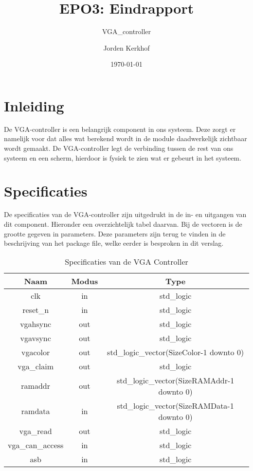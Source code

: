 \documentclass{scrartcl}  %
\author{ Jorden {Kerkhof}  }
\title{EPO3: Eindrapport}
\subtitle{VGA\_controller}
\date {\today}
\begin{document}
\maketitle
\vspace{80 mm}

\newpage
\setlength{\cftbeforetoctitleskip}{-3em}
\tableofcontents
\newpage

\section{Inleiding}
De VGA-controller is een belangrijk component in ons systeem. Deze zorgt er namelijk voor dat alles wat berekend wordt in de module daadwerkelijk zichtbaar wordt gemaakt. De VGA-controller legt de verbinding tussen de rest van ons systeem en een scherm, hierdoor is fysiek te zien wat er gebeurt in het systeem. 

\section{Specificaties}

De specificaties van de VGA-controller zijn uitgedrukt in de in- en uitgangen van dit component. Hieronder een overzichtelijk tabel daarvan. Bij de vectoren is de grootte gegeven in parameters. Deze parameters zijn terug te vinden in de beschrijving van het package file, welke eerder is besproken in dit verslag.

\begin{table}[H]
\centering
\caption{Specificaties van de VGA Controller }
\label{tab:spec-vgacontroller}
\begin{tabular}{c c c}
	\hline\hline
 	Naam & Modus & Type\\
 	\hline	
	clk & in & std\_logic \\ 
	reset\_n & in & std\_logic \\ 
	vgahsync & out & std\_logic \\ 
	vgavsync & out & std\_logic \\ 
	vgacolor & out & std\_logic\_vector(SizeColor-1 downto 0) \\
	vga\_claim & out & std\_logic \\ 
	ramaddr & out & std\_logic\_vector(SizeRAMAddr-1 downto 0) \\
	ramdata & in & std\_logic\_vector(SizeRAMData-1 downto 0) \\ 
	vga\_read & out & std\_logic \\
	vga\_can\_access & in & std\_logic \\
	asb & in & std\_logic \\
  	\hline\hline
\end{tabular}
\end{table}
\end{document}
